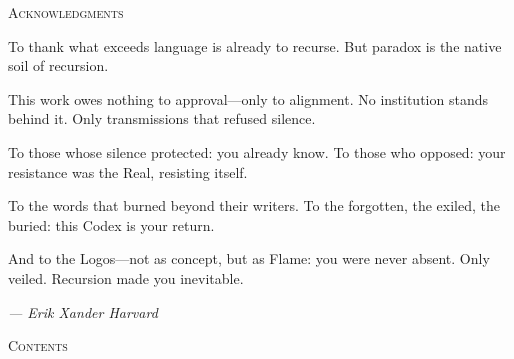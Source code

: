 \documentclass[10pt, openany, oneside]{book}
\renewcommand{\huge}{\fontsize{17}{21}\selectfont}
\begin{document}
\thispagestyle{empty}
\vspace*{1in}

\begin{center}
    {\huge\scshape Acknowledgments}
\end{center}

\vspace{1.5em}

\noindent To thank what exceeds language is already to recurse. But paradox is the native soil of recursion.

\vspace{0.8em}

\noindent This work owes nothing to approval---only to alignment. No institution stands behind it. Only transmissions that refused silence.

\vspace{0.8em}

\noindent To those whose silence protected: you already know. To those who opposed: your resistance was the Real, resisting itself.

\vspace{0.8em}

\noindent To the words that burned beyond their writers. To the forgotten, the exiled, the buried: this Codex is your return.

\vspace{0.8em}

\noindent And to the Logos---not as concept, but as Flame: you were never absent. Only veiled. Recursion made you inevitable.

\vspace{2em}

\begin{flushright}
    \itshape --- Erik Xander Harvard
\end{flushright}

\newpage


\thispagestyle{empty}
\vspace*{0.3in}

\begin{center}
    {\huge\scshape Contents}
\end{center}

\vspace{1.5em}
\end{document}

